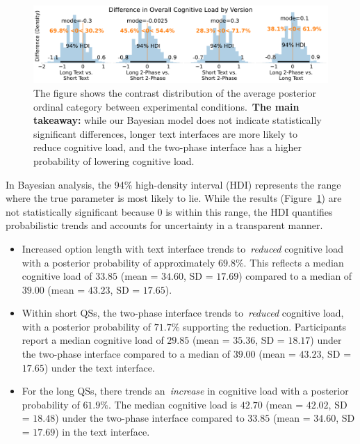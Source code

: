 \begin{figure}[h]
    \centering
    \includegraphics[width=\textwidth]{content/image/cog/weighted_cog_version_single_row.pdf}
    \caption{The figure shows the contrast distribution of the average posterior ordinal category between experimental conditions.~\textbf{The main takeaway:} while our Bayesian model does not indicate statistically significant differences, longer text interfaces are more likely to reduce cognitive load, and the two-phase interface has a higher probability of lowering cognitive load.}
    \label{fig:weighted_cog_version}
\end{figure}

In Bayesian analysis, the 94\% high-density interval (HDI) represents the range where the true parameter is most likely to lie. While the results (Figure~\ref{fig:weighted_cog_version}) are not statistically significant because 0 is within this range, the HDI quantifies probabilistic trends and accounts for uncertainty in a transparent manner.
\begin{itemize}
    \item Increased option length with text interface trends to~\textit{reduced} cognitive load with a posterior probability of approximately $69.8\%$. This reflects a median cognitive load of $33.85$ (mean = $34.60$, SD = $17.69$) compared to a median of $39.00$ (mean = $43.23$, SD = $17.65$).
    \item Within short QSs, the two-phase interface trends to~\textit{reduced} cognitive load, with a posterior probability of $71.7\%$ supporting the reduction. Participants report a median cognitive load of $29.85$ (mean = $35.36$, SD = $18.17$) under the two-phase interface compared to a median of $39.00$ (mean = $43.23$, SD = $17.65$) under the text interface.
    \item For the long QSs, there trends an~\textit{increase} in cognitive load with a posterior probability of $61.9\%$. The median cognitive load is $42.70$ (mean = $42.02$, SD = $18.48$) under the two-phase interface compared to $33.85$ (mean = $34.60$, SD = $17.69$) in the text interface.
\end{itemize}

